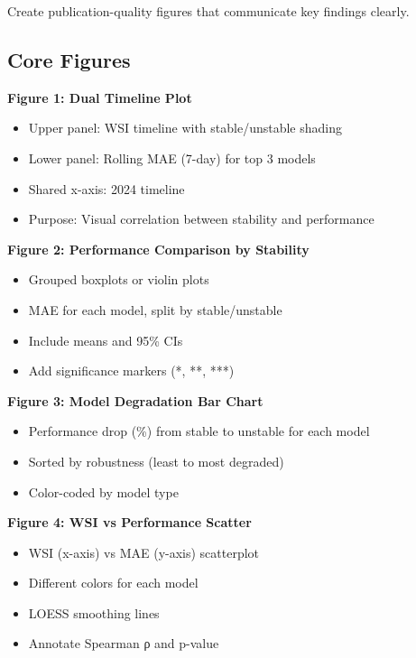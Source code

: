 \documentclass[11pt,a4paper]{article}
\begin{document}
\begin{objectivebox}
Create publication-quality figures that communicate key findings clearly.
\end{objectivebox}

\subsection{Core Figures}

\textbf{Figure 1: Dual Timeline Plot}
\begin{itemize}
    \item Upper panel: WSI timeline with stable/unstable shading
    \item Lower panel: Rolling MAE (7-day) for top 3 models
    \item Shared x-axis: 2024 timeline
    \item Purpose: Visual correlation between stability and performance
\end{itemize}

\textbf{Figure 2: Performance Comparison by Stability}
\begin{itemize}
    \item Grouped boxplots or violin plots
    \item MAE for each model, split by stable/unstable
    \item Include means and 95\% CIs
    \item Add significance markers (*, **, ***)
\end{itemize}

\textbf{Figure 3: Model Degradation Bar Chart}
\begin{itemize}
    \item Performance drop (\%) from stable to unstable for each model
    \item Sorted by robustness (least to most degraded)
    \item Color-coded by model type
\end{itemize}

\textbf{Figure 4: WSI vs Performance Scatter}
\begin{itemize}
    \item WSI (x-axis) vs MAE (y-axis) scatterplot
    \item Different colors for each model
    \item LOESS smoothing lines
    \item Annotate Spearman ρ and p-value
\end{itemize}
\end{document}
